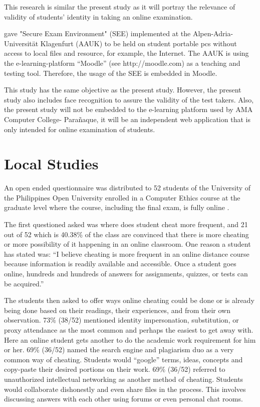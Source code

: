 This research is similar the present study as it will portray the relevance of validity of students’ identity in taking an online examination.

 gave "Secure Exam Environment" (SEE) implemented at the Alpen-Adria-Universität Klagenfurt (AAUK) to be held on student portable pcs without access to local files and resource, for example, the Internet.
The AAUK is using the e-learning-platform “Moodle” (see http://moodle.com) as a teaching and testing tool.
Therefore, the usage of the SEE is embedded in Moodle.

This study has the same objective as the present study.
However, the present study also includes face recognition to assure the validity of the test takers.
Also, the present study will not be embedded to the e-learning platform used by AMA Computer College- Parañaque, it will be an independent web application that is only intended for online examination of students.

\section{Local Studies}

An open ended questionnaire was distributed to 52 students of the University of the Philippines Open University enrolled in a Computer Ethics course at the graduate level where the course, including the final exam, is fully online \cite{ravasco2012technology}.

The first questioned asked was where does student cheat more frequent, and 21 out of 52 which is 40.38\% of the class are convinced that there is more cheating or more possibility of it happening in an online classroom.
One reason a student has stated was: “I believe cheating is more frequent in an online distance course because information is readily available and accessible. Once a student goes online, hundreds and hundreds of answers for assignments, quizzes, or tests can be acquired.”

The students then asked to offer ways online cheating could be done or is already being done based on their readings, their experiences, and from their own observation.
73\% (38/52) mentioned identity impersonation, substitution, or proxy attendance as the most common and perhaps the easiest to get away with.
Here an online student gets another to do the academic work requirement for him or her.
69\% (36/52) named the search engine and plagiarism duo as a very common way of cheating.
Students would “google” terms, ideas, concepts and copy-paste their desired portions on their work.
69\% (36/52) referred to unauthorized intellectual networking as another method of cheating.
Students would collaborate dishonestly and even share files in the process.
This involves discussing answers with each other using forums or even personal chat rooms.

